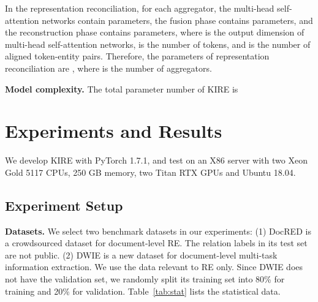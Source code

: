 \documentclass[runningheads]{llncs}
\begin{document}
In the representation reconciliation, for each aggregator, the multi-head self-attention networks contain  parameters, the fusion phase contains  parameters, and the reconstruction phase contains  parameters, where  is the output dimension of multi-head self-attention networks,  is the number of tokens, and  is the number of aligned token-entity pairs. 
Therefore, the parameters of representation reconciliation are , where  is the number of aggregators.

\textbf{Model complexity.}
The total parameter number of KIRE is 


\section{Experiments and Results}
\label{sect:exp}

We develop KIRE with PyTorch 1.7.1, and test on an X86 server with two Xeon Gold 5117 CPUs, 250 GB memory, two Titan RTX GPUs and Ubuntu 18.04. 


\subsection{Experiment Setup}
\label{subsect:setup}

\textbf{Datasets.} 
We select two benchmark datasets in our experiments:
(1) DocRED \cite{yao2019docred} is a crowdsourced dataset for document-level RE.
The relation labels in its test set are not public.
(2) DWIE \cite{zaporojets2021dwie} is a new dataset for document-level multi-task information extraction. 
We use the data relevant to RE only.
Since DWIE does not have the validation set, we randomly split its training set into 80\% for training and 20\% for validation. Table~\ref{tab:stat} lists the statistical data.

\begin{table}[!tb]\setlength\tabcolsep{2pt}
\caption{Dataset statistics. Inst. denotes relation instances excluding N/A relation.}
\centering
{}
\label{tab:stat} 
\end{table}
\end{document}
